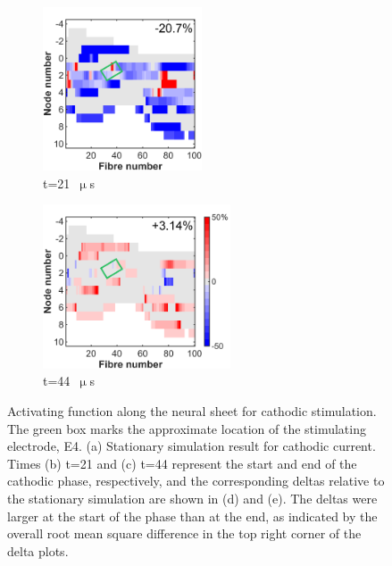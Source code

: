 \begin{figure}
\begin{subfigure}[t]{0.32\textwidth}
        \phantom{\hspace{4.96cm}}
    \end{subfigure}%
    \begin{subfigure}[t]{0.32\textwidth}
        \centering
        \includegraphics[height=4.85cm]{Simulations/TimeDep/cathDelta_AF-term4-hemi_gnd-t21_-20p716RMS}
        \caption{t=21~$ \upmu $s}
        \label{fig:af_delta_t21}
    \end{subfigure}%
    \begin{subfigure}[t]{0.36\textwidth}
        \centering
        \includegraphics[height=4.85cm]{Simulations/TimeDep/cathDelta_AF-term4-hemi_gnd-t44_3p142RMS}
        \caption{t=44~$ \upmu $s}
        \label{fig:af_delta_t44}
    \end{subfigure}%
    
	\caption[Activating function along the neural sheet (cathodic)]{Activating
	function along the neural sheet for cathodic stimulation. The green box marks
	the approximate location of the stimulating electrode, E4. (a) Stationary
	simulation result for cathodic current. Times (b) t=21 and (c) t=44 represent
	the start and end of the cathodic phase, respectively, and the corresponding
	deltas relative to the stationary simulation are shown in (d) and (e). The
	deltas were larger at the start of the phase than at the end, as indicated by
	the overall root mean square difference in the top right corner of the delta
	plots.}
	\label{fig:af_cathodic_comparison}
\end{figure}

